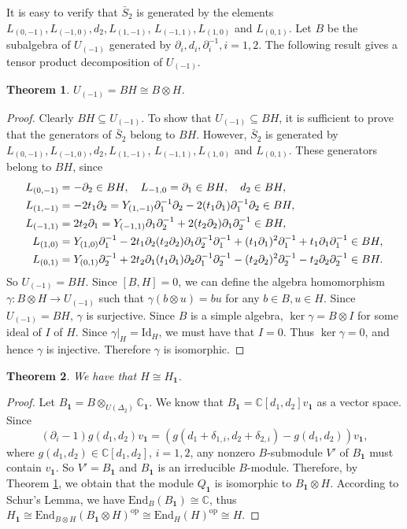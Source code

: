 \documentclass[12pt,a4paper]{amsart}
\newtheorem{Theorem}{Theorem}[section]
\def\m1{\mathbf{1}}
\def\p{\partial}
\def\bS{\bar{S}_2}
\begin{document}
It is easy to verify that $\bS$ is generated by the elements
$L_{(0,-1)},L_{(-1,0)},d_2,L_{(1,-1)}$, $L_{(-1,1)},L_{(1,0)}$ and $L_{(0,1)}$.
Let $B$ be the subalgebra of $U_{(-1)}$
generated by $\p_i, d_i, \p_i^{-1}, i=1,2$.
The following result gives a tensor product decomposition of $U_{(-1)}$.




\begin{Theorem}\label{tensor-iso} $U_{(-1)} =BH\cong B\otimes H$.
\end{Theorem}

\begin{proof} Clearly $BH \subseteq U_{(-1)}$. To show that $U_{(-1)} \subseteq BH$, it is sufficient to prove that the generators of $\bS$ belong to $BH$. However, $\bS$ is generated by $L_{(0,-1)},L_{(-1,0)},d_2,L_{(1,-1)}$, $L_{(-1,1)},L_{(1,0)}$ and $L_{(0,1)}$. These generators belong to
$BH$, since
$$\aligned L_{(0,-1)}&=-\p_2\in BH,\quad  L_{-1,0}=\p_1\in BH,\quad d_2\in BH,\\
L_{(1,-1)}&=-2t_1\p_2=  Y_{(1,-1)}\p_1^{-1}\p_2-2(t_1\p_1)\p_1^{-1}\p_2\in BH ,\\
L_{(-1,1)}&=2t_2\p_1=  Y_{(-1,1)}\p_1\p_2^{-1}+2(t_2\p_2)\p_1\p_2^{-1} \in BH,\\
L_{(1,0)}&
=Y_{(1,0)}\p_1^{-1}-2t_1\p_2(t_2\p_2)\p_1\p_2^{-1}\p_1^{-1}
+(t_1\p_1)^2\p_1^{-1}+t_1\p_1\p_1^{-1}\in BH,\\
L_{(0,1)}&
=Y_{(0,1)}\p_2^{-1}+2t_2\p_1(t_1\p_1)\p_2\p_1^{-1}\p_2^{-1}
-(t_2\p_2)^2\p_2^{-1}-t_2\p_2\p_2^{-1}\in BH.
\endaligned$$
So $U_{(-1)} =BH$.
Since $[B,H]=0$,   we can define the algebra homomorphism
$\gamma: B\otimes H\rightarrow U_{(-1)}$ such that
$\gamma(b\otimes u)=bu$ for any $b\in B, u\in H$.
Since $U_{(-1)} =BH$, $\gamma$ is surjective. Since
$B$ is  a simple algebra, $\ker \gamma=B\otimes I$ for some ideal of
$I$ of $H$. Since $\gamma|_H=\mathrm{Id}_H$,  we must have that $I=0$.
Thus $\ker \gamma=0$, and hence $\gamma$ is injective. Therefore $\gamma$ is isomorphic.
\end{proof}

\begin{Theorem}\label{endo}
We have that $H\cong H_{\m1}$.
\end{Theorem}
\begin{proof}  Let $B_{\mathbf{1}}=B\otimes_{U(\Delta_2)}\mathbb{C}_{\mathbf{1}}$. We know that $B_{\mathbf{1}}=\mathbb{C}[d_1,d_2]v_{\mathbf{1}}$ as a vector space. Since
$$(\partial_i-1)g(d_1,d_2)v_{\mathbf{1}}=(g(d_1+\delta_{1,i},d_2+\delta_{2,i})-g(d_1,d_2))v_{\mathbf{1}},$$
where $g(d_1,d_2)\in \mathbb{C}[d_1,d_2]$, $i=1,2$,  any nonzero $B$-submodule $V'$ of $B_\mathbf{1}$ must contain $v_{\mathbf{1}}$. So $V'=B_{\mathbf{1}}$ and $B_{\mathbf{1}}$ is an irreducible $B$-module.
Therefore, by Theorem \ref{tensor-iso},
 we obtain that the module $Q_{\mathbf{1}}$ is isomorphic to $B_{\mathbf{1}}\otimes H$. According to Schur's Lemma, we have $\text{End}_{B}(B_{\mathbf{1}}) \cong \mathbb{C}$, thus $H_{\mathbf{1}} \cong \text{End}_{B\otimes H}(B_{\mathbf{1}}\otimes H)^{\text{op}} \cong \text{End}_{H}(H)^{\text{op}} \cong H$.
\end{proof}
\end{document}
